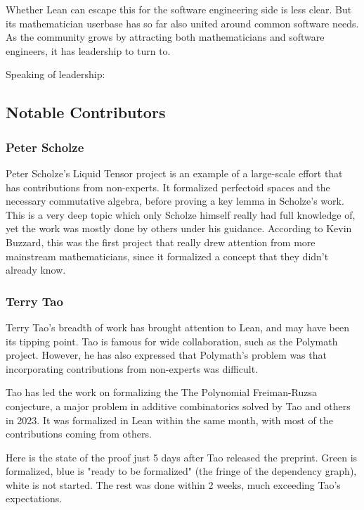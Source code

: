 \documentclass{article}
\begin{document}
Whether Lean can escape this for the software engineering side is less clear. But its mathematician userbase has so far also united around common software needs. As the community grows by attracting both mathematicians and software engineers, it has leadership to turn to.


Speaking of leadership:

\subsection{Notable Contributors}

\subsubsection{Peter Scholze}
Peter Scholze's Liquid Tensor project is an example of a large-scale effort that has contributions from non-experts. It formalized perfectoid spaces and the necessary commutative algebra, before proving a key lemma in Scholze's work. This is a very deep topic which only Scholze himself really had full knowledge of, yet the work was mostly done by others under his guidance. According to Kevin Buzzard\cite{personal-communication}, this was the first project that really drew attention from more mainstream mathematicians, since it formalized a concept that they didn't already know.

\subsubsection{Terry Tao}
Terry Tao's breadth of work has brought attention to Lean, and may have been its tipping point. Tao is famous for wide collaboration, such as the Polymath project\cite{polymath}. However, he has also expressed that Polymath's problem was that incorporating contributions from non-experts was difficult.

Tao has led the work on formalizing the The Polynomial Freiman-Ruzsa conjecture, a major problem in additive combinatorics solved by Tao and others in 2023. It was formalized in Lean within the same month, with most of the contributions coming from others.

Here is the state of the proof just 5 days after Tao released the preprint. Green is formalized, blue is "ready to be formalized" (the fringe of the dependency graph), white is not started. The rest was done within 2 weeks, much exceeding Tao's expectations.
\end{document}
